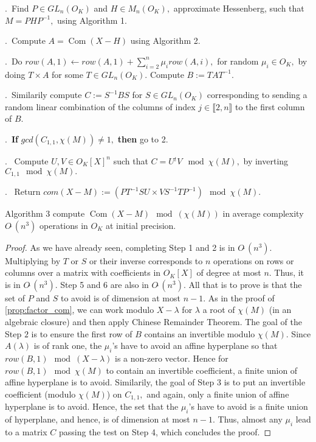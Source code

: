 \documentclass{sig-alternate-05-2015}
\DeclareMathOperator{\com}{Com}
\newcommand{\softO}{O\tilde{~}}
\begin{document}
\smallskip

.\ Find $P \in GL_n(O_K)$ and $H \in M_n(O_K),$ approximate Hessenberg,
such that $M=PHP^{-1},$ using Algorithm 1. 

.\ Compute $A=\com (X-H)$ using Algorithm 2.


.\ Do $row(A,1) \leftarrow row(A,1)+\sum_{i=2}^n \mu_i row(A,i),$ for
random $\mu_i \in O_K,$ by doing $T \times A$ for some $T \in GL_n(O_K).$
Compute $B:=TAT^{-1}.$

.\ Similarily compute $C:=S^{-1}BS$ for $S \in GL_n(O_K)$ corresponding to
sending a random linear combination of the columns of index $j \in \llbracket 2,n \rrbracket$
to the first column of $B.$ 

.\  \textbf{If} $gcd(C_{1,1}, \chi(M)) \neq 1,$ \textbf{then} go to 2.

. \ Compute $U,V \in O_K[X]^n$ such that $C=U {}^t V \mod \chi (M),$
by inverting $C_{1,1} \mod \chi(M).$

. \ Return $com(X-M):=(PT^{-1}S U \times V S^{-1} T P^{-1}) \mod \chi (M).$

\vspace{-1ex}\noindent\hrulefill

\medskip


\begin{theo}
Algorithm 3 compute 
$\com (X-M) \mod (\chi(M))$ in average complexity $\softO (n^3)$
operations in $O_K$ at initial precision.
\end{theo}
\begin{proof}
As we have already seen, completing Step 1 and 2 is in $\softO (n^3).$
Multiplying by $T$ or $S$ or their inverse corresponds
to $n$ operations on rows or columns over a matrix with coefficients
in $O_K[X]$ of degree at most $n.$
Thus, it is in $\softO (n^3).$
Step 5 and 6 are also in $\softO (n^3).$
All that is to prove is that the set of $P$ and $S$ to avoid
is of dimension at most $n-1.$
As in the proof of \ref{prop:factor_com}, we can work modulo $X-\lambda$
for $\lambda$ a root of $\chi (M)$ (in an algebraic closure)
and then apply Chinese Remainder Theorem.
The goal of the Step $2$ is to ensure the first row of $B$ contains an
invertible modulo $\chi (M).$
Since $A(\lambda)$ is of rank one, the $\mu_i$'s have to avoid an
affine hyperplane so that $row(B,1) \mod (X-\lambda)$ is a non-zero vector.
Hence for $row(B,1) \mod \chi (M)$ to contain an invertible coefficient,
a finite union of affine hyperplane is to avoid.
Similarily, the goal of Step 3 is to put an invertible coefficient (modulo
$\chi(M)$) on $C_{1,1},$ and again, only a finite union of affine
hyperplane is to avoid.
Hence, the set that the $\mu_i$'s have to avoid is a finite union
of hyperplane, and hence, is of dimension at most $n-1.$
Thus, almost any $\mu_i$ lead to a matrix $C$ passing the test
on Step 4, which concludes the proof.
\end{proof}
\end{document}
